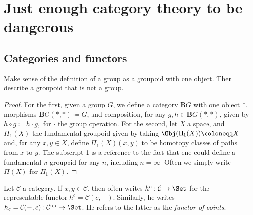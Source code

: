 \chapter{Just enough category theory to be dangerous}

\section{Categories and functors}

\begin{exercise}
	Make sense of the definition of a group as a groupoid with one object. Then describe a groupoid that is not a group.
\end{exercise}
\begin{proof}
	For the first, given a group $G$, we define a category $\mathbf{B} G$ with one object $*$, morphisms $\mathbf{B} G(*,*)\coloneqq G$, and composition, for any $g,h\in \mathbf{B} G(*,*)$, given by $h\circ g \coloneqq h\cdot g,$ for $\cdot$ the group operation. For the second, let $X$ a space, and $\Pi _1(X)$ the fundamental groupoid given by taking $\Obj(\Pi _1(X)) \coloneqq X$ and, for any $x,y\in X$, define $\Pi _1(X)(x,y)$ to be homotopy classes of paths from $x$ to $y$. The subscript 1 is a reference to the fact that one could define a fundamental $n$-groupoid for any $n$, including $n=\infty $. Often we simply write $\Pi (X)$ for $\Pi _1(X)$.
\end{proof}


\begin{notation}
	Let $\mathcal{C} $ a category. If $x,y\in \mathcal{C} $, then \cite{vakil} often writes $h^c : \mathcal{C}  \to \Set $ for the representable functor $h^c = \mathcal{C} (c,-)$. Similarly, he writes $h_c = \mathcal{C} (-,c): \mathcal{C} ^{\mathrm{op}}  \to \Set $. He refers to the latter as the \emph{functor of points}.
\end{notation}

